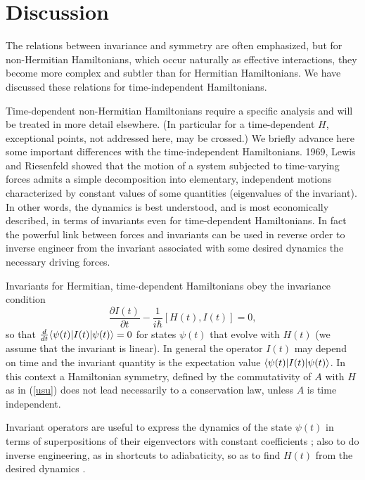 \section{Discussion}
%
%
The relations between invariance and symmetry are often emphasized,
but for non-Hermitian Hamiltonians, which occur naturally as effective interactions, they become more complex
and subtler than for Hermitian Hamiltonians.
We have discussed these relations for time-independent Hamiltonians.

Time-dependent non-Hermitian
Hamiltonians require a specific analysis and will be treated in more detail
elsewhere. (In particular
for a time-dependent $H$, exceptional points, not addressed here,  may be crossed.)
We briefly advance here some important differences with the time-independent Hamiltonians.
1969, Lewis and Riesenfeld \cite{Lewis1969} showed that the motion of a system subjected to time-varying
forces admits a simple decomposition into elementary, independent motions characterized by constant
values of some quantities (eigenvalues of the invariant).
In other words, the dynamics is best
understood, and is most economically described, in terms of invariants even for time-dependent Hamiltonians.
In fact the powerful link between
forces and invariants can be used in reverse order to inverse engineer from the invariant associated with
some desired dynamics the necessary driving forces.

Invariants for Hermitian, time-dependent Hamiltonians obey the
invariance condition
%
\begin{equation}
\frac{\partial I(t)}{\partial t}-\frac{1}{i\hbar}[H(t),I(t)]=0,
\label{gene}
\end{equation}
%
so that $\frac{d}{dt}\langle {\psi}(t)|I(t)|\psi(t)\rangle=0$ for states $\psi(t)$ that evolve  with $H(t)$
(we assume that the invariant is linear).
In general the  operator $I(t)$ may depend on time and the invariant quantity is the expectation
value $\langle \psi(t)|I(t)|\psi(t)\rangle$.
In this context a  Hamiltonian symmetry, defined
by the commutativity of $A$ with $H$ as in (\ref{usu}) does not lead necessarily to a  conservation
law, unless $A$ is time independent.
%

Invariant operators  are useful to express the dynamics of the state $\psi(t)$ in terms of
superpositions of their  eigenvectors with constant coefficients \cite{Lewis1969}; also to do inverse
engineering, as in shortcuts to adiabaticity,
so as to find $H(t)$ from the desired dynamics \cite{Ibanez2011,Torrontegui2013}.

